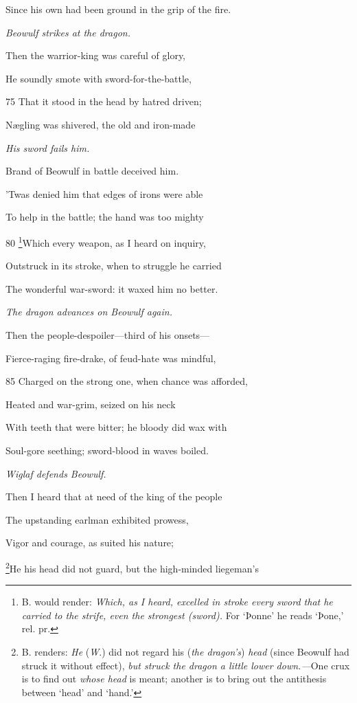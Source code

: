 Since his own had been ground in the grip of the fire.

\emph{Beowulf strikes at
the dragon.}

Then the warrior-king was careful of glory,

He soundly smote with sword-for-the-battle,

75
That it stood in the head by hatred driven;

Nægling was shivered, the old and iron-made

\emph{His sword fails
him.}

Brand of Beowulf in battle deceived him.

’Twas denied him that edges of irons were able

To help in the battle; the hand was too mighty

80
\footnote{B. would render: \emph{Which, as I heard, excelled in stroke every sword that
he carried to the strife, even the strongest (sword).} For ‘Þonne’ he reads
‘Þone,’ rel. pr.}Which every weapon, as I heard on inquiry,

Outstruck in its stroke, when to struggle he carried

The wonderful war-sword: it waxed him no better.

\emph{The dragon advances
on Beowulf
again.}

Then the people-despoiler—third of his onsets—

Fierce-raging fire-drake, of feud-hate was mindful,

85
Charged on the strong one, when chance was afforded,

Heated and war-grim, seized on his neck

With teeth that were bitter; he bloody did wax with

Soul-gore seething; sword-blood in waves boiled.



\emph{Wiglaf defends
Beowulf.}

Then I heard that at need of the king of the people

The upstanding earlman exhibited prowess,

Vigor and courage, as suited his nature;

\footnote{B. renders: \emph{He} (\emph{W}.) did not regard his (\emph{the dragon’s}) \emph{head} (since
Beowulf had struck it without effect), \emph{but struck the dragon a little lower down.—}One
crux is to find out \emph{whose head} is meant; another is to bring out the
antithesis between ‘head’ and ‘hand.’}He his head did not guard, but the high-minded liegeman’s

